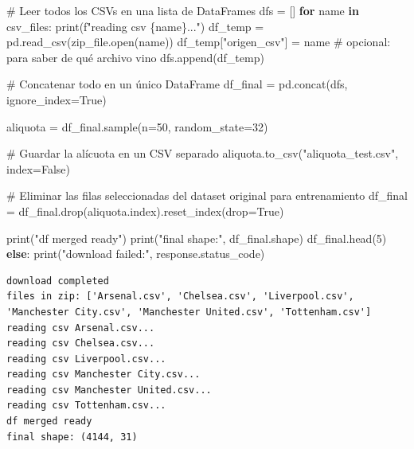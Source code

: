 \documentclass[
  letterpaper,
  DIV=11,
  numbers=noendperiod]{scrartcl}
\newenvironment{Shaded}{\begin{snugshade}}{\end{snugshade}}
\newcommand{\BuiltInTok}[1]{\textcolor[rgb]{0.00,0.23,0.31}{#1}}
\newcommand{\CommentTok}[1]{\textcolor[rgb]{0.37,0.37,0.37}{#1}}
\newcommand{\ControlFlowTok}[1]{\textcolor[rgb]{0.00,0.23,0.31}{\textbf{#1}}}
\newcommand{\DecValTok}[1]{\textcolor[rgb]{0.68,0.00,0.00}{#1}}
\newcommand{\KeywordTok}[1]{\textcolor[rgb]{0.00,0.23,0.31}{\textbf{#1}}}
\newcommand{\NormalTok}[1]{\textcolor[rgb]{0.00,0.23,0.31}{#1}}
\newcommand{\OperatorTok}[1]{\textcolor[rgb]{0.37,0.37,0.37}{#1}}
\newcommand{\SpecialCharTok}[1]{\textcolor[rgb]{0.37,0.37,0.37}{#1}}
\newcommand{\SpecialStringTok}[1]{\textcolor[rgb]{0.13,0.47,0.30}{#1}}
\newcommand{\StringTok}[1]{\textcolor[rgb]{0.13,0.47,0.30}{#1}}
\newcommand{\VariableTok}[1]{\textcolor[rgb]{0.07,0.07,0.07}{#1}}
\begin{document}
\begin{Shaded}
\begin{Highlighting}[]
        \CommentTok{\# Leer todos los CSVs en una lista de DataFrames}
\NormalTok{        dfs }\OperatorTok{=}\NormalTok{ []}
        \ControlFlowTok{for}\NormalTok{ name }\KeywordTok{in}\NormalTok{ csv\_files:}
            \BuiltInTok{print}\NormalTok{(}\SpecialStringTok{f"reading csv }\SpecialCharTok{\{}\NormalTok{name}\SpecialCharTok{\}}\SpecialStringTok{..."}\NormalTok{)}
\NormalTok{            df\_temp }\OperatorTok{=}\NormalTok{ pd.read\_csv(zip\_file.}\BuiltInTok{open}\NormalTok{(name))}
\NormalTok{            df\_temp[}\StringTok{"origen\_csv"}\NormalTok{] }\OperatorTok{=}\NormalTok{ name  }\CommentTok{\# opcional: para saber de qué archivo vino}
\NormalTok{            dfs.append(df\_temp)}

        \CommentTok{\# Concatenar todo en un único DataFrame}
\NormalTok{        df\_final }\OperatorTok{=}\NormalTok{ pd.concat(dfs, ignore\_index}\OperatorTok{=}\VariableTok{True}\NormalTok{)}

\NormalTok{        aliquota }\OperatorTok{=}\NormalTok{ df\_final.sample(n}\OperatorTok{=}\DecValTok{50}\NormalTok{, random\_state}\OperatorTok{=}\DecValTok{32}\NormalTok{)}

        \CommentTok{\# Guardar la alícuota en un CSV separado}
\NormalTok{        aliquota.to\_csv(}\StringTok{"aliquota\_test.csv"}\NormalTok{, index}\OperatorTok{=}\VariableTok{False}\NormalTok{)}

        \CommentTok{\# Eliminar las filas seleccionadas del dataset original para entrenamiento}
\NormalTok{        df\_final }\OperatorTok{=}\NormalTok{ df\_final.drop(aliquota.index).reset\_index(drop}\OperatorTok{=}\VariableTok{True}\NormalTok{)}

        \BuiltInTok{print}\NormalTok{(}\StringTok{"df merged ready"}\NormalTok{)}
        \BuiltInTok{print}\NormalTok{(}\StringTok{"final shape:"}\NormalTok{, df\_final.shape)}
\NormalTok{        df\_final.head(}\DecValTok{5}\NormalTok{)}
\ControlFlowTok{else}\NormalTok{:}
    \BuiltInTok{print}\NormalTok{(}\StringTok{"download failed:"}\NormalTok{, response.status\_code)}

\end{Highlighting}
\end{Shaded}

\begin{verbatim}
download completed 
files in zip: ['Arsenal.csv', 'Chelsea.csv', 'Liverpool.csv', 'Manchester City.csv', 'Manchester United.csv', 'Tottenham.csv']
reading csv Arsenal.csv...
reading csv Chelsea.csv...
reading csv Liverpool.csv...
reading csv Manchester City.csv...
reading csv Manchester United.csv...
reading csv Tottenham.csv...
df merged ready
final shape: (4144, 31)
\end{verbatim}
\end{document}
